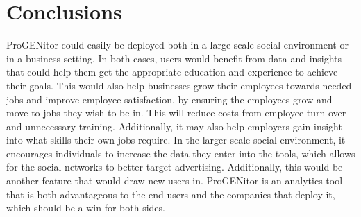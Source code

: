 \section{Conclusions}
\label{sect:conclusions}
ProGENitor could easily be deployed both in a large scale social environment or
in a business setting.  In both cases, users would benefit from data and
insights that could help them get the appropriate education and experience to
achieve their goals.  This would also help businesses grow their employees
towards needed jobs and improve employee satisfaction, by ensuring the employees
grow and move to jobs they wish to be in.  This will reduce costs from
employee turn over and unnecessary training.  Additionally, it may also help
employers gain insight into what skills their own jobs require.  In the larger
scale social environment, it encourages individuals to increase the data they
enter into the tools, which allows for the social networks to better target
advertising.  Additionally, this would be another feature that would draw new
users in.  ProGENitor is an analytics tool that is both advantageous to the
end users and the companies that deploy it, which should be a win for both
sides.

